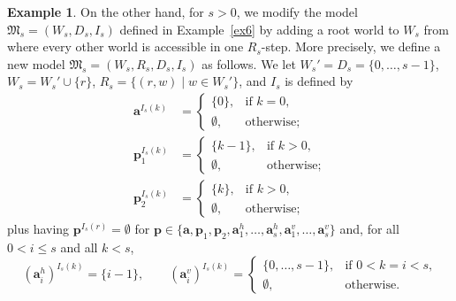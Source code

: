 \documentclass[10pt,a4paper]{amsart}
\theoremstyle{plain}
\theoremstyle{definition}
\newtheorem{exa}[thm]{Example}
\newcommand{\fform}[1]{\boldsymbol{#1}}
\newcommand{\pvar}{\fform{p}}
\newcommand{\avar}{\fform{a}}
\begin{document}
\begin{exa}
	
	On the other hand, for $s>0$, 
	we modify the model $\mathfrak{M}_s=(W_s,D_s,I_s)$ defined in Example~\ref{ex6}
	by adding a root world to $W_s$ from where every other world is accessible in one $R_s$-step.
	More precisely, we define a new model $\mathfrak{M}_s=(W_s,R_s,D_s,I_s)$ as follows.
	We let $W_s'=D_s=\{0,\dots,s-1\}$, $W_s=W_s'\cup \{r\}$, $R_s=\{(r,w)\mid w\in W_s'\}$, and $I_s$ is defined
	by 
	\begin{align}
		\label{uiep1}
		\avar^{I_s(k)} & = \left\{
		\begin{array}{ll}
			\{0\},  & \mbox{if $k=0$,}\\[3pt]
			\emptyset, &\mbox{otherwise};
		\end{array}
		\right.
		\\
		\pvar_{1}^{I_{s}(k)}  & = \left\{
		\begin{array}{ll}
			\{k-1\},  & \mbox{if $k>0$,}\\[3pt]
			\emptyset, &\mbox{otherwise};
		\end{array}
		\right.
		\\
		\label{uiep3}   
		\pvar_{2}^{I_{s}(k)}  & = \left\{
		\begin{array}{ll}
			\{k\},  & \mbox{if $k>0$,}\\[3pt]
			\emptyset, &\mbox{otherwise};
		\end{array}
		\right.
	\end{align}
	plus having $\pvar^{I_s(r)}=\emptyset$ for 
	$\pvar\in\{\avar,\pvar_1,\pvar_2,\avar_1^h,\dots,\avar_s^h,\avar_1^v,\dots,\avar_s^v\}$ and, for all 
	$0<i\le s$ and all $k<s$,
%
\[
				(\avar_{i}^h)^{I_{s}(k)}   = \{i-1\},
		\qquad
		(\avar_{i}^v)^{I_{s}(k)}   = \left\{
		\begin{array}{ll}
			\{0,\ldots,s-1\},  & \mbox{if $0<k=i<s$,}\\[3pt]
			\emptyset, &\mbox{otherwise.}
		\end{array}
\]
\end{exa}
\end{document}
